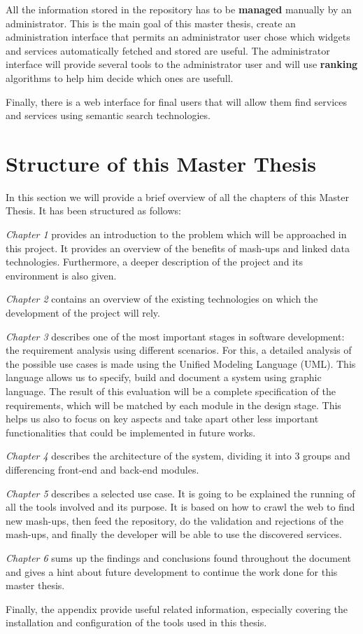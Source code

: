 All the information stored in the repository has to be \textbf{managed} manually by an administrator. This is the main goal of this master thesis, create an administration interface that permits an administrator user chose which widgets and services automatically fetched and stored are useful. The administrator interface will provide several tools to the administrator user and will use \textbf{ranking} algorithms to help him decide which ones are usefull.

Finally, there is a web interface for final users that will allow them find services and services using semantic search technologies.


\section{Structure of this Master Thesis}

In this section we will provide a brief overview of all the chapters of this Master Thesis. It
has been structured as follows:

\textit{Chapter 1} provides an introduction to the problem which will be approached in this project. It provides an overview of the benefits of mash-ups and linked data technologies. Furthermore, a deeper description of the project and its environment is also given.

\textit{Chapter 2} contains an overview of the existing technologies on which the development of the project will rely.

\textit{Chapter 3} describes one of the most important stages in software development: the requirement analysis using different scenarios. For this, a detailed analysis of the possible use cases is made using the Unified Modeling Language (UML). This language allows us to specify, build and document a system using graphic language.
The result of this evaluation will be a complete specification of the requirements, which will be matched by each module in the design stage. This helps us also to focus on key aspects and take apart other less important functionalities that could be implemented in future works.

\textit{Chapter 4} describes the architecture of the system, dividing it into 3 groups and differencing front-end and back-end modules.

\textit{Chapter 5} describes a selected use case. It is going to be explained the running of all the tools involved and its purpose. It is based on how to crawl the web to find new mash-ups, then feed the repository, do the validation and rejections of the mash-ups, and finally the developer will be able to use the discovered services.

\textit{Chapter 6} sums up the findings and conclusions found throughout the document and gives a hint about future development to continue the work done for this master thesis.

Finally, the appendix provide useful related information, especially covering the installation and configuration of the tools used in this thesis.